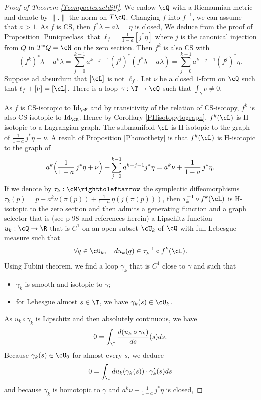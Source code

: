 \begin{proof}[Proof of Theorem \ref{Tcompactexactdiff}]
We endow $\cQ$ with a Riemannian metric and denote by $\|.\|$ the norm on $T\cQ$. Changing $f$ into $f^{-1}$, we can assume that $a>1$. As $f$ is CS, then $f^*\lambda-a\lambda=\eta$ is closed, We deduce from the proof of Proposition \ref{Puniqueclass} that $\ell_f=\frac{1}{1-a}[j^*\eta]$ where $j$ is the canonical injection from $Q$ in $T^*Q=\cM$ on the zero section.
Then $f^k$ is also CS with
\[
(f^k)^*\lambda-a^k\lambda=\sum_{j=0}^{k-1}a^{k-j-1}(f^j)^*(f^*\lambda-a\lambda)=\sum_{j=0}^{k-1}a^{k-j-1}(f^j)^*\eta.
\]
Suppose ad absurdum that $[\cL]$ is not $\ell_f$. Let $\nu$ be a closed $1$-form on $\cQ$ such that $\ell_f+[\nu]=[\cL]$. There is a loop $\gamma:\T\to\cQ$ such that $\int_\gamma \nu\not=0$.

As $f$ is CS-isotopic to ${\rm Id}_\cM$ and by transitivity of the relation of CS-isotopy, $f^k$ is also CS-isotopic to ${\rm Id}_\cM$. Hence by Corollary \ref{PHisotopytograph}, $f^k(\cL)$ is H-isotopic to a Lagrangian graph. The submanifold $\cL$ is H-isotopic to the graph of
$\frac{1}{1-a}\,j^*\eta+\nu$. A result of Proposition \ref{Phomothety} is that $f^k(\cL)$ is H-isotopic to the graph of
\[
a^k\Bigl( \frac{1}{1-a}\,j^*\eta+\nu\Bigr)+\sum_{j=0}^{k-1}a^{k-j-1}j^*\eta=a^k\nu+\frac{1}{1-a}\,j^*\eta.
\]
If we denote by $\tau_k:\cM\righttoleftarrow$ the symplectic diffeomorphisms $\tau_k(p)=p+ a^k\nu(\pi(p))+\frac{1}{1-a}\,\eta(j(\pi(p)))$, then $\tau_{k}^{-1}\circ f^k(\cL)$ is H-isotopic to the zero section and then admits a generating function and a graph selector that is (see \eg \cite{Sib2004} p 98 and references herein) a Lipschitz function $u_k:\cQ\to \R$ that is $C^1$ on an open subset $\cU_k$ of $\cQ$ with full Lebesgue measure such that
\[
\forall q\in\cU_k,\quad du_k(q)\in \tau_{k}^{-1}\circ f^k(\cL).
\]
Using Fubini theorem, we find a loop $\gamma_k$ that is $C^1$ close to $\gamma$ and such that
\begin{itemize}
\item $\gamma_k$ is smooth and isotopic to $\gamma$;
\item for Lebesgue almost $s\in\T$, we have $\gamma_k(s)\in\cU_k$.
\end{itemize}
As $u_k\circ \gamma_k $ is Lipschitz and then absolutely continuous, we have
\[
0=\int_\T \frac{d(u_k\circ \gamma_k)}{ds}(s)ds.
\]
Because $\gamma_k(s)\in\cU_0$ for almost every $s$, we deduce
\[
0=\int_\T du_k(\gamma_k(s))\cdot \gamma_k'(s)ds
\]
and because $\gamma_k$ is homotopic to $\gamma$ and $a^k\nu+\frac{1}{1-a}\,j^*\eta$ is closed,

\end{proof}
